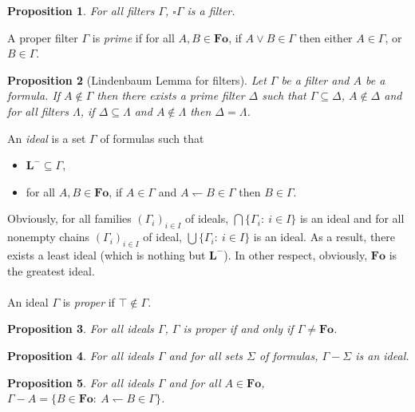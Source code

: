 \documentclass[draft]{article}
\newtheorem{proposition}{Proposition}
\def\Fo{\mathbf{Fo}}
\def\L{\mathbf{L}}
\begin{document}
%
%
\begin{proposition}\label{Proposition:about:filters:and:square:operation}
%
%
For all filters $\Gamma$, ${\square}\Gamma$ is a filter.
%
%
\end{proposition}
%
%
A proper filter $\Gamma$ is {\em prime}\/ if for all $A,B{\in}\Fo$, if $A{\vee}B{\in}\Gamma$ then either $A{\in}\Gamma$, or $B{\in}\Gamma$.
%
%
\begin{proposition}[Lindenbaum Lemma for filters]\label{Proposition:let:be:a:filter:and:be:a:formula:if:then:there:exists:a:prime:filter:such:that:and:for:all:filters:if:and:then}
%
%
Let $\Gamma$ be a filter and $A$ be a formula.
If $A{\not\in}\Gamma$ then there exists a prime filter $\Delta$ such that $\Gamma{\subseteq}\Delta$, $A{\not\in}\Delta$ and for all filters $\Lambda$, if $\Delta{\subseteq}\Lambda$ and $A{\not\in}\Lambda$ then $\Delta{=}\Lambda$.
%
%
\end{proposition}
%
%
An {\em ideal}\/ is a set $\Gamma$ of formulas such that
%
%
\begin{itemize}
%
%
\item $\L^{-}{\subseteq}\Gamma$,
%
%
\item for all $A,B{\in}\Fo$, if $A{\in}\Gamma$ and $A{\leftharpoondown}B{\in}\Gamma$ then $B{\in}\Gamma$.
%
%
\end{itemize}
%
%
Obviously, for all families $(\Gamma_{i})_{i{\in}I}$ of ideals, $\bigcap\{\Gamma_{i}:\ i{\in}I\}$ is an ideal and for all nonempty chains $(\Gamma_{i})_{i{\in}I}$ of ideal, $\bigcup\{\Gamma_{i}:\ i{\in}I\}$ is an ideal.
As a result, there exists a least ideal (which is nothing but $\L^{-}$).
In other respect, obviously, $\Fo$ is the greatest ideal.
%
%
\\
\\
%
%
An ideal $\Gamma$ is {\em proper}\/ if ${\top}{\not\in}\Gamma$.
%
%
\begin{proposition}\label{Proposition:for:all:constructive:model:logics:the:following:proper:ideals}
%
%
For all ideals $\Gamma$, $\Gamma$ is proper if and only if $\Gamma{\not=}\Fo$.
%
%
\end{proposition}
%
%
\begin{proposition}\label{Proposition:53bis:Gamma:moins:Sigma:is:an:ideal}
%
%
For all ideals $\Gamma$ and for all sets $\Sigma$ of formulas, $\Gamma{-}\Sigma$ is an ideal.
%
%
\end{proposition}
%
%
\begin{proposition}\label{Proposition:about:ideals:formulas:and:operation:moins:for:a:single:formula}
%
%
For all ideals $\Gamma$ and for all $A{\in}\Fo$, $\Gamma{-}A{=}\{B{\in}\Fo:\ A{\leftharpoondown}B{\in}\Gamma\}$.
%
%
\end{proposition}
\end{document}
